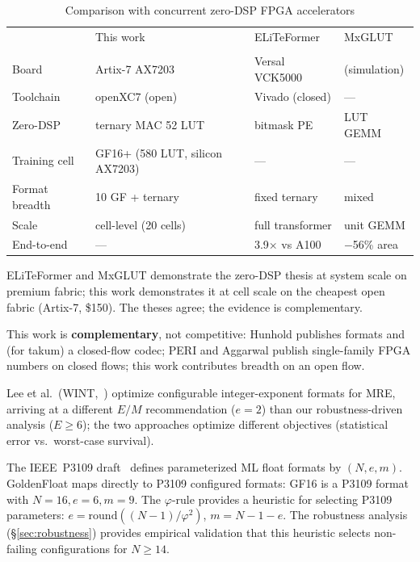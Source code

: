 \documentclass[11pt]{article}
\begin{document}
\begin{table}[h]
\footnotesize
\caption{Comparison with concurrent zero-DSP FPGA accelerators}
\label{tab:competitors}
\centering
\begin{tabular}{llll}
\toprule
 & This work & ELiTeFormer & MxGLUT \\
 & & \cite{eliformer2026} & \cite{mxglut2026} \\
\midrule
Board & Artix-7 AX7203 & Versal VCK5000 & (simulation) \\
Toolchain & openXC7 (open) & Vivado (closed) & --- \\
Zero-DSP & ternary MAC 52 LUT & bitmask PE & LUT GEMM \\
Training cell & GF16+ (580 LUT, silicon AX7203) & --- & --- \\
Format breadth & 10 GF + ternary & fixed ternary & mixed \\
Scale & cell-level (20 cells) & full transformer & unit GEMM \\
End-to-end & --- & 3.9$\times$ vs A100 & $-$56\% area \\
\bottomrule
\end{tabular}
\end{table}

ELiTeFormer and MxGLUT demonstrate the zero-DSP thesis at system scale on
premium fabric; this work demonstrates it at cell scale on the cheapest open
fabric (Artix-7, \$150). The theses agree; the evidence is complementary.

This work is \textbf{complementary}, not competitive: Hunhold publishes formats
and (for takum) a closed-flow codec; PERI and Aggarwal publish single-family
FPGA numbers on closed flows; this work contributes breadth on an open flow.

Lee et al.\ (WINT,~\cite{lee2026wint}) optimize configurable integer-exponent
formats for MRE, arriving at a different $E/M$ recommendation ($e{=}2$) than
our robustness-driven analysis ($E{\geq}6$); the two approaches optimize
different objectives (statistical error vs.\ worst-case survival).

The IEEE~P3109 draft~\cite{fitzgibbon2026p3109} defines parameterized
ML float formats by $(N, e, m)$. GoldenFloat maps directly to P3109
configured formats: GF16 is a P3109 format with $N{=}16, e{=}6,
m{=}9$. The $\varphi$-rule provides a heuristic for selecting P3109
parameters: $e = \mathrm{round}((N{-}1)/\varphi^2)$, $m = N{-}1{-}e$.
The robustness analysis (\S\ref{sec:robustness}) provides empirical
validation that this heuristic selects non-failing configurations for
$N \geq 14$.
\end{document}
